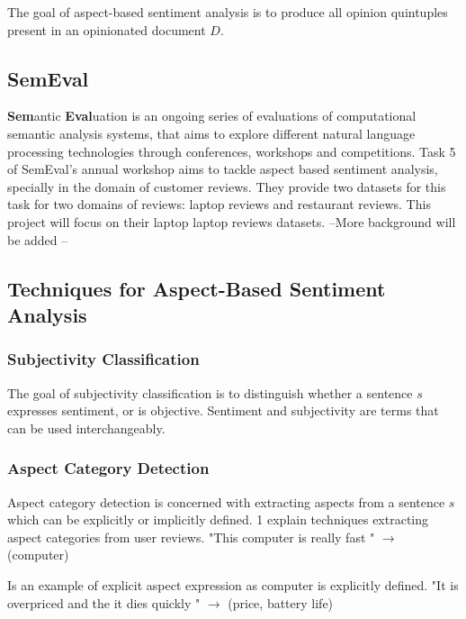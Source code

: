 \documentclass[11pt]{article}
\begin{document}
The goal of aspect-based sentiment analysis is to produce all opinion quintuples present in an opinionated document $D$.

\subsection{SemEval}
\textbf{Sem}antic \textbf{Eval}uation is an ongoing series of evaluations of computational semantic analysis systems, that aims to explore different natural language processing technologies through conferences, workshops and competitions. 
Task 5 of SemEval's annual workshop aims to tackle aspect based sentiment analysis, specially in the domain of customer reviews. They provide two datasets for this task for two domains of reviews: laptop reviews and restaurant reviews. This project will focus on their laptop laptop reviews datasets.  
--More background will be added -- 

\subsection{Techniques for Aspect-Based Sentiment Analysis}
\subsubsection{Subjectivity Classification}
The goal of subjectivity classification is to distinguish whether a sentence $s$ expresses sentiment, or is objective. Sentiment and subjectivity are terms that can be used interchangeably.   
\subsubsection{Aspect Category Detection}
Aspect category detection is concerned with extracting aspects from a sentence $s$ which can be explicitly or implicitly defined. 1 explain techniques extracting aspect categories from user reviews.
\newline\newline
"This computer is really fast " $\rightarrow$  (computer)

Is an example of explicit aspect expression as computer is explicitly defined.
\newline\newline
"It is overpriced and the it dies quickly " $\rightarrow$ (price, battery life)
\end{document}
